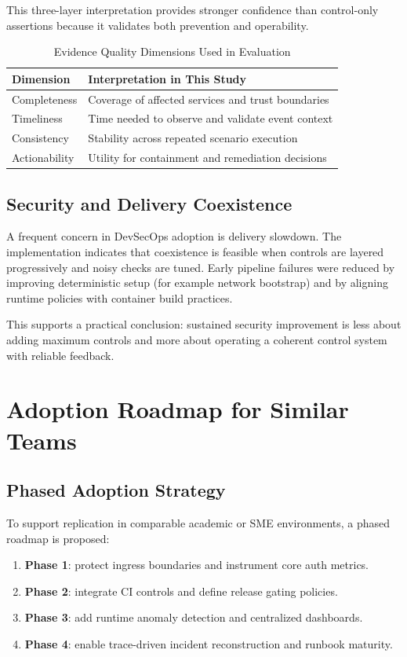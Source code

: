 \documentclass[conference]{IEEEtran}
\begin{document}
This three-layer interpretation provides stronger confidence than control-only assertions because it validates both prevention and operability.

\begin{table}[!t]
\caption{Evidence Quality Dimensions Used in Evaluation}
\centering
\footnotesize
\begin{tabularx}{\linewidth}{>{\raggedright\arraybackslash}p{1.1cm} Y}
\toprule
Dimension & Interpretation in This Study \\
\midrule
Completeness & Coverage of affected services and trust boundaries \\
Timeliness & Time needed to observe and validate event context \\
Consistency & Stability across repeated scenario execution \\
Actionability & Utility for containment and remediation decisions \\
\bottomrule
\end{tabularx}
\label{tab:evidencequality}
\end{table}

\subsection{Security and Delivery Coexistence}
A frequent concern in DevSecOps adoption is delivery slowdown. The implementation indicates that coexistence is feasible when controls are layered progressively and noisy checks are tuned. Early pipeline failures were reduced by improving deterministic setup (for example network bootstrap) and by aligning runtime policies with container build practices.

This supports a practical conclusion: sustained security improvement is less about adding maximum controls and more about operating a coherent control system with reliable feedback.

\section{Adoption Roadmap for Similar Teams}
\subsection{Phased Adoption Strategy}
To support replication in comparable academic or SME environments, a phased roadmap is proposed:
\begin{enumerate}
\item \textbf{Phase 1}: protect ingress boundaries and instrument core auth metrics.
\item \textbf{Phase 2}: integrate CI controls and define release gating policies.
\item \textbf{Phase 3}: add runtime anomaly detection and centralized dashboards.
\item \textbf{Phase 4}: enable trace-driven incident reconstruction and runbook maturity.
\end{enumerate}
\end{document}

